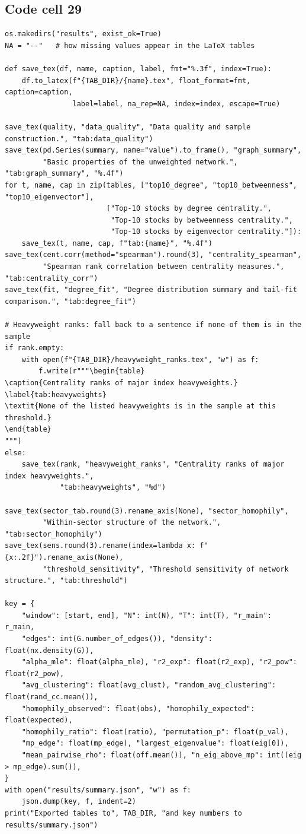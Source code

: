 \documentclass[12pt,a4paper]{report}
\begin{document}
\subsection*{Code cell 29}
\begin{lstlisting}[style=fancy]
os.makedirs("results", exist_ok=True)
NA = "--"   # how missing values appear in the LaTeX tables

def save_tex(df, name, caption, label, fmt="%.3f", index=True):
    df.to_latex(f"{TAB_DIR}/{name}.tex", float_format=fmt, caption=caption,
                label=label, na_rep=NA, index=index, escape=True)

save_tex(quality, "data_quality", "Data quality and sample construction.", "tab:data_quality")
save_tex(pd.Series(summary, name="value").to_frame(), "graph_summary",
         "Basic properties of the unweighted network.", "tab:graph_summary", "%.4f")
for t, name, cap in zip(tables, ["top10_degree", "top10_betweenness", "top10_eigenvector"],
                        ["Top-10 stocks by degree centrality.",
                         "Top-10 stocks by betweenness centrality.",
                         "Top-10 stocks by eigenvector centrality."]):
    save_tex(t, name, cap, f"tab:{name}", "%.4f")
save_tex(cent.corr(method="spearman").round(3), "centrality_spearman",
         "Spearman rank correlation between centrality measures.", "tab:centrality_corr")
save_tex(fit, "degree_fit", "Degree distribution summary and tail-fit comparison.", "tab:degree_fit")

# Heavyweight ranks: fall back to a sentence if none of them is in the sample
if rank.empty:
    with open(f"{TAB_DIR}/heavyweight_ranks.tex", "w") as f:
        f.write(r"""\begin{table}
\caption{Centrality ranks of major index heavyweights.}
\label{tab:heavyweights}
\textit{None of the listed heavyweights is in the sample at this threshold.}
\end{table}
""")
else:
    save_tex(rank, "heavyweight_ranks", "Centrality ranks of major index heavyweights.",
             "tab:heavyweights", "%d")

save_tex(sector_tab.round(3).rename_axis(None), "sector_homophily",
         "Within-sector structure of the network.", "tab:sector_homophily")
save_tex(sens.round(3).rename(index=lambda x: f"{x:.2f}").rename_axis(None),
         "threshold_sensitivity", "Threshold sensitivity of network structure.", "tab:threshold")

key = {
    "window": [start, end], "N": int(N), "T": int(T), "r_main": r_main,
    "edges": int(G.number_of_edges()), "density": float(nx.density(G)),
    "alpha_mle": float(alpha_mle), "r2_exp": float(r2_exp), "r2_pow": float(r2_pow),
    "avg_clustering": float(avg_clust), "random_avg_clustering": float(rand_cc.mean()),
    "homophily_observed": float(obs), "homophily_expected": float(expected),
    "homophily_ratio": float(ratio), "permutation_p": float(p_val),
    "mp_edge": float(mp_edge), "largest_eigenvalue": float(eig[0]),
    "mean_pairwise_rho": float(off.mean()), "n_eig_above_mp": int((eig > mp_edge).sum()),
}
with open("results/summary.json", "w") as f:
    json.dump(key, f, indent=2)
print("Exported tables to", TAB_DIR, "and key numbers to results/summary.json")
\end{lstlisting}
\end{document}
